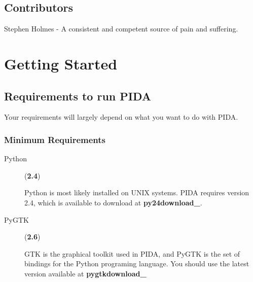 \documentclass[10pt,a4paper,english]{article}
\begin{document}

\hypertarget{contributors}{}
\subsection*{Contributors}

Stephen Holmes - A consistent and competent source of pain and suffering.



\hypertarget{getting-started}{}
\section*{Getting Started}



\hypertarget{requirements-to-run-pida}{}
\subsection*{Requirements to run PIDA}

Your requirements will largely depend on what you want to do with PIDA.



\hypertarget{minimum-requirements}{}
\subsubsection*{Minimum Requirements}
\begin{description}
\item[Python] (\textbf{2.4})

Python is most likely installed on UNIX systems. PIDA requires version 2.4,
which is available to download at {\color{red}\bfseries{}py24download{\_}}.

\item[PyGTK] (\textbf{2.6})

GTK is the graphical toolkit used in PIDA, and PyGTK is the set of bindings
for the Python programing language. You should use the latest version
available at {\color{red}\bfseries{}pygtkdownload{\_}}

\end{description}
\end{document}
